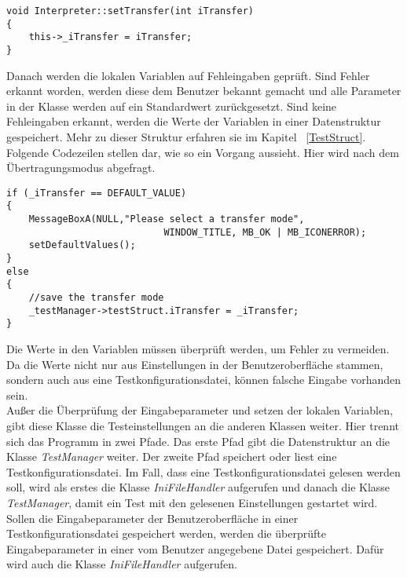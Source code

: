 \begin{lstlisting}	 
void Interpreter::setTransfer(int iTransfer)
{
	this->_iTransfer = iTransfer;
}
\end{lstlisting}

Danach werden die lokalen Variablen auf Fehleingaben geprüft. Sind Fehler erkannt worden, werden diese dem Benutzer bekannt gemacht und alle Parameter in der Klasse werden auf ein Standardwert zurückgesetzt. Sind keine Fehleingaben erkannt, werden die Werte der Variablen in einer Datenstruktur gespeichert. Mehr zu dieser Struktur erfahren sie im Kapitel ~\ref{TestStruct}. Folgende Codezeilen stellen dar, wie so ein Vorgang aussieht. Hier wird nach dem Übertragungsmodus abgefragt.

\begin{lstlisting}	 
if (_iTransfer == DEFAULT_VALUE)
{
	MessageBoxA(NULL,"Please select a transfer mode",
							WINDOW_TITLE, MB_OK | MB_ICONERROR);
	setDefaultValues();
}
else
{
	//save the transfer mode
	_testManager->testStruct.iTransfer = _iTransfer;
}
\end{lstlisting}

Die Werte in den Variablen müssen überprüft werden, um Fehler zu vermeiden. Da die Werte nicht nur aus Einstellungen in der Benutzeroberfläche stammen, sondern auch aus eine Testkonfigurationsdatei, können falsche Eingabe vorhanden sein.\\

Außer die Überprüfung der Eingabeparameter und setzen der lokalen Variablen, gibt diese Klasse die Testeinstellungen an die anderen Klassen weiter. Hier trennt sich das Programm in zwei Pfade. Das erste Pfad gibt die Datenstruktur an die Klasse \textit{TestManager} weiter. Der zweite Pfad speichert oder liest eine Testkonfigurationsdatei. Im Fall, dass eine Testkonfigurationsdatei gelesen werden soll, wird als erstes die Klasse \textit{IniFileHandler} aufgerufen und danach die Klasse \textit{TestManager}, damit ein Test mit den gelesenen Einstellungen gestartet wird. Sollen die Eingabeparameter der Benutzeroberfläche in einer Testkonfigurationsdatei gespeichert werden, werden die überprüfte Eingabeparameter in einer vom Benutzer angegebene Datei gespeichert. Dafür wird auch die Klasse \textit{IniFileHandler} aufgerufen.\\

